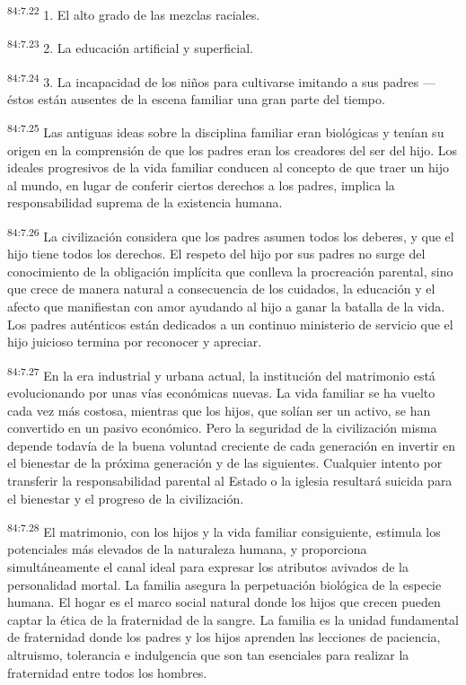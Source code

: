 \documentclass[twoside, 11pt]{book}
\begin{document}
\par
\textsuperscript{84:7.22} 1. El alto grado de las mezclas raciales.

\par
\textsuperscript{84:7.23} 2. La educación artificial y superficial.

\par
\textsuperscript{84:7.24} 3. La incapacidad de los niños para cultivarse imitando a sus padres ---éstos están ausentes de la escena familiar una gran parte del tiempo.

\par
\textsuperscript{84:7.25} Las antiguas ideas sobre la disciplina familiar eran biológicas y tenían su origen en la comprensión de que los padres eran los creadores del ser del hijo. Los ideales progresivos de la vida familiar conducen al concepto de que traer un hijo al mundo, en lugar de conferir ciertos derechos a los padres, implica la responsabilidad suprema de la existencia humana.

\par
\textsuperscript{84:7.26} La civilización considera que los padres asumen todos los deberes, y que el hijo tiene todos los derechos. El respeto del hijo por sus padres no surge del conocimiento de la obligación implícita que conlleva la procreación parental, sino que crece de manera natural a consecuencia de los cuidados, la educación y el afecto que manifiestan con amor ayudando al hijo a ganar la batalla de la vida. Los padres auténticos están dedicados a un continuo ministerio de servicio que el hijo juicioso termina por reconocer y apreciar.

\par
\textsuperscript{84:7.27} En la era industrial y urbana actual, la institución del matrimonio está evolucionando por unas vías económicas nuevas. La vida familiar se ha vuelto cada vez más costosa, mientras que los hijos, que solían ser un activo, se han convertido en un pasivo económico. Pero la seguridad de la civilización misma depende todavía de la buena voluntad creciente de cada generación en invertir en el bienestar de la próxima generación y de las siguientes. Cualquier intento por transferir la responsabilidad parental al Estado o la iglesia resultará suicida para el bienestar y el progreso de la civilización.

\par
\textsuperscript{84:7.28} El matrimonio, con los hijos y la vida familiar consiguiente, estimula los potenciales más elevados de la naturaleza humana, y proporciona simultáneamente el canal ideal para expresar los atributos avivados de la personalidad mortal. La familia asegura la perpetuación biológica de la especie humana. El hogar es el marco social natural donde los hijos que crecen pueden captar la ética de la fraternidad de la sangre. La familia es la unidad fundamental de fraternidad donde los padres y los hijos aprenden las lecciones de paciencia, altruismo, tolerancia e indulgencia que son tan esenciales para realizar la fraternidad entre todos los hombres.
\end{document}
